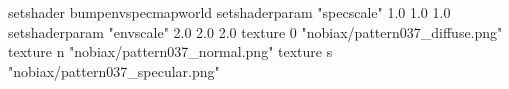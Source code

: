 setshader bumpenvspecmapworld
setshaderparam "specscale" 1.0 1.0 1.0
setshaderparam "envscale"  2.0 2.0 2.0
    texture 0 "nobiax/pattern037_diffuse.png"
    texture n "nobiax/pattern037_normal.png"
    texture s "nobiax/pattern037_specular.png"